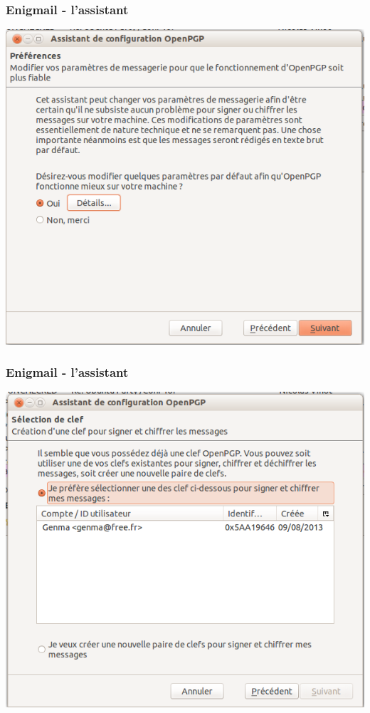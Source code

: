 \documentclass{beamer}
\begin{document}
\begin{frame}
\frametitle{Enigmail - l'assistant}
\begin{center}
\includegraphics[scale=0.3] {./images/Assistant04.png}
\end{center}
\end{frame}

\begin{frame}
\frametitle{Enigmail - l'assistant}
\begin{center}
\includegraphics[scale=0.3] {./images/Assistant05.png}
\end{center}
\end{frame}
\end{document}
